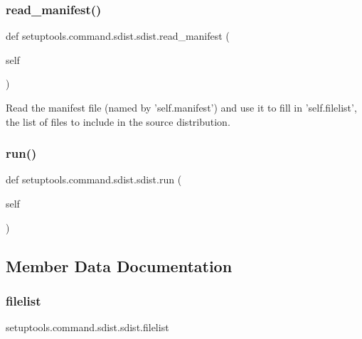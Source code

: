 \subsubsection{\texorpdfstring{read\+\_\+manifest()}{read\_manifest()}}
{\footnotesize\ttfamily def setuptools.\+command.\+sdist.\+sdist.\+read\+\_\+manifest (\begin{DoxyParamCaption}\item[{}]{self }\end{DoxyParamCaption})}

\begin{DoxyVerb}Read the manifest file (named by 'self.manifest') and use it to
fill in 'self.filelist', the list of files to include in the source
distribution.
\end{DoxyVerb}
 \mbox{\label{classsetuptools_1_1command_1_1sdist_1_1sdist_aff1d5d55ae04ff524b1b5ba77818bf58}} 
\subsubsection{\texorpdfstring{run()}{run()}}
{\footnotesize\ttfamily def setuptools.\+command.\+sdist.\+sdist.\+run (\begin{DoxyParamCaption}\item[{}]{self }\end{DoxyParamCaption})}



\subsection{Member Data Documentation}
\mbox{\label{classsetuptools_1_1command_1_1sdist_1_1sdist_a6a32cd8d6db51f0418ef5208afdb19bd}} 
\subsubsection{\texorpdfstring{filelist}{filelist}}
{\footnotesize\ttfamily setuptools.\+command.\+sdist.\+sdist.\+filelist}

